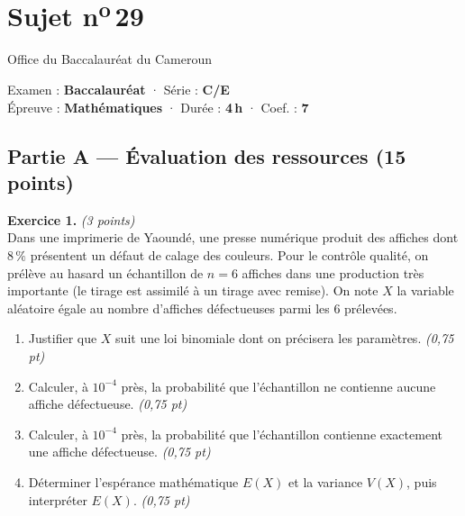 \section{Sujet n\textsuperscript{o}\,29}
\noindent\begin{minipage}{0.5\linewidth}\footnotesize Office du Baccalauréat du Cameroun\end{minipage}%
\hfill\begin{minipage}{0.45\linewidth}\footnotesize\raggedleft Examen : \textbf{Baccalauréat} · Série : \textbf{C/E}\\
Épreuve : \textbf{Mathématiques} · Durée : \textbf{4\,h} · Coef. : \textbf{7}\end{minipage}
\par\smallskip{\color{onbo}\rule{\linewidth}{1pt}}

\subsection*{Partie A — Évaluation des ressources \hfill (15 points)}

\noindent\textbf{Exercice 1.} \hfill\textit{(3 points)}\\
Dans une imprimerie de Yaoundé, une presse numérique produit des affiches dont
$8\,\%$ présentent un défaut de calage des couleurs. Pour le contrôle qualité, on prélève
au hasard un échantillon de $n=6$ affiches dans une production très importante (le tirage
est assimilé à un tirage avec remise). On note $X$ la variable aléatoire égale au nombre
d'affiches défectueuses parmi les $6$ prélevées.
\begin{enumerate}[label=\arabic*)]
\item Justifier que $X$ suit une loi binomiale dont on précisera les paramètres. \hfill\textit{(0,75 pt)}
\item Calculer, à $10^{-4}$ près, la probabilité que l'échantillon ne contienne aucune
affiche défectueuse. \hfill\textit{(0,75 pt)}
\item Calculer, à $10^{-4}$ près, la probabilité que l'échantillon contienne exactement
une affiche défectueuse. \hfill\textit{(0,75 pt)}
\item Déterminer l'espérance mathématique $E(X)$ et la variance $V(X)$, puis interpréter
$E(X)$. \hfill\textit{(0,75 pt)}
\end{enumerate}

